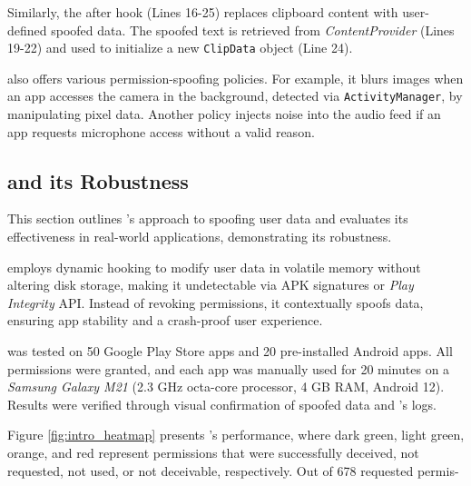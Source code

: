 Similarly, the after hook (Lines 16-25) replaces clipboard content with user-defined spoofed data. The spoofed text is retrieved from \textit{ContentProvider} (Lines 19-22) and used to initialize a new \texttt{ClipData} object (Line 24).

\framework{} also offers various permission-spoofing policies. For example, it blurs images when an app accesses the camera in the background, detected via \texttt{ActivityManager}, by manipulating pixel data. Another policy injects noise into the audio feed if an app requests microphone access without a valid reason.

\subsection{\framework{} and its Robustness}
This section outlines \framework{}'s approach to spoofing user data and evaluates its effectiveness in real-world applications, demonstrating its robustness.

 \framework{} employs dynamic hooking to modify user data in volatile memory without altering disk storage, making it undetectable via APK signatures or \textit{Play Integrity} API. Instead of revoking permissions, it contextually spoofs data, ensuring app stability and a crash-proof user experience.

 \framework{} was tested on 50 Google Play Store apps and 20 pre-installed Android apps. All permissions were granted, and each app was manually used for 20 minutes on a \textit{Samsung Galaxy M21} (2.3 GHz octa-core processor, 4 GB RAM, Android 12). Results were verified through visual confirmation of spoofed data and \framework{}'s logs.

Figure \ref{fig:intro_heatmap} presents \framework{}'s performance, where dark green, light green, orange, and red represent permissions that were successfully deceived, not requested, not used, or not deceivable, respectively. Out of 678 requested permis-



